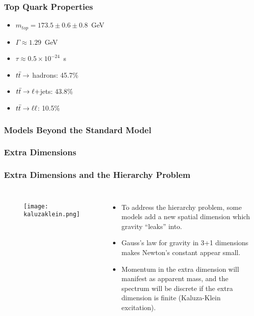 \begin{frame}[noframenumbering, label=topprops]
    \frametitle{Top Quark Properties}
\begin{itemize}
    \item $m_{top} = 173.5 \pm 0.6 \pm 0.8$~GeV
    \item $\Gamma \approx 1.29$~GeV
    \item $\tau \approx 0.5 \times 10^{-24}$~s
    \item $t\bar t \to$ hadrons: 45.7\%
    \item $t\bar t \to \ell +$jets: 43.8\%
    \item $t\bar t \to \ell\ell$: 10.5\%
\end{itemize}

\centering
{}
\end{frame}

\subsubsection*{Models Beyond the Standard Model}

\subsubsection*{Extra Dimensions}
\label{extradims}

\begin{frame}[noframenumbering]
\frametitle{Extra Dimensions and the Hierarchy Problem}
\begin{columns}
\centering
{}
\begin{figure}
\texttt{[image: kaluzaklein.png]}
\end{figure}
\begin{itemize}
    \item To address the hierarchy problem, some models add a new
        spatial dimension which gravity ``leaks'' into.
    \item Gauss's law for gravity in 3+1 dimensions makes Newton's
        constant appear small.
    \item Momentum in the extra dimension will manifest as apparent
        mass, and the spectrum will be discrete if the extra
        dimension is finite (Kaluza-Klein excitation).
\end{itemize}
\end{columns}
\end{frame}

